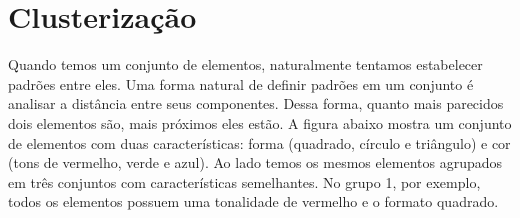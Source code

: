 \clearpage
\section{Clusterização}
\label{sec:clusterização}

Quando temos um conjunto de elementos, naturalmente tentamos estabelecer padrões entre eles. Uma forma natural de definir padrões em um conjunto é analisar a distância entre seus componentes. Dessa forma, quanto mais parecidos dois elementos são, mais próximos eles estão. A figura abaixo mostra um conjunto de elementos com duas características: forma (quadrado, círculo e triângulo) e cor (tons de vermelho, verde e azul). Ao lado temos os mesmos elementos agrupados em três conjuntos com características semelhantes. No grupo 1, por exemplo, todos os elementos possuem uma tonalidade de vermelho e o formato quadrado.

